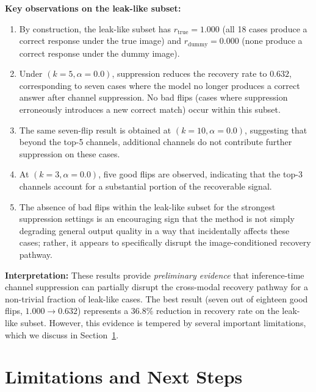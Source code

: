 \documentclass[12pt, a4paper]{article}
\begin{document}
\textbf{Key observations on the leak-like subset:}

\begin{enumerate}[label=(\arabic*), itemsep=4pt]
  \item By construction, the leak-like subset has $r_{\text{true}} = 1.000$ (all 18
    cases produce a correct response under the true image) and
    $r_{\text{dummy}} = 0.000$ (none produce a correct response under the dummy image).

  \item Under $(k=5, \alpha=0.0)$, suppression reduces the recovery rate to $0.632$,
    corresponding to seven cases where the model no longer produces a correct
    answer after channel suppression.
    No bad flips (cases where suppression erroneously introduces a new correct match)
    occur within this subset.

  \item The same seven-flip result is obtained at $(k=10, \alpha=0.0)$, suggesting
    that beyond the top-5 channels, additional channels do not contribute further
    suppression on these cases.

  \item At $(k=3, \alpha=0.0)$, five good flips are observed, indicating that the
    top-3 channels account for a substantial portion of the recoverable signal.

  \item The absence of bad flips within the leak-like subset for the strongest
    suppression settings is an encouraging sign that the method is not simply degrading
    general output quality in a way that incidentally affects these cases; rather,
    it appears to specifically disrupt the image-conditioned recovery pathway.
\end{enumerate}

\textbf{Interpretation:}
These results provide \emph{preliminary evidence} that inference-time channel
suppression can partially disrupt the cross-modal recovery pathway for a non-trivial
fraction of leak-like cases.
The best result (seven out of eighteen good flips, $1.000 \to 0.632$) represents a
$36.8\%$ reduction in recovery rate on the leak-like subset.
However, this evidence is tempered by several important limitations, which we discuss in
Section~\ref{sec:limits}.


\section{Limitations and Next Steps}
\label{sec:limits}
\end{document}

